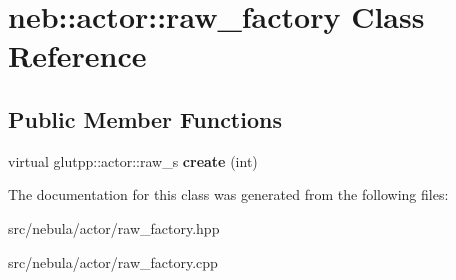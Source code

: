 \hypertarget{classneb_1_1actor_1_1raw__factory}{
\section{neb::actor::raw\_\-factory Class Reference}
\label{classneb_1_1actor_1_1raw__factory}
}
\subsection*{Public Member Functions}
\begin{DoxyCompactItemize}
\item 
\hypertarget{classneb_1_1actor_1_1raw__factory_a2118b6982b4d59339bbb855e3beaaba9}{
virtual glutpp::actor::raw\_\-s {\bfseries create} (int)}
\label{classneb_1_1actor_1_1raw__factory_a2118b6982b4d59339bbb855e3beaaba9}

\end{DoxyCompactItemize}


The documentation for this class was generated from the following files:\begin{DoxyCompactItemize}
\item 
src/nebula/actor/raw\_\-factory.hpp\item 
src/nebula/actor/raw\_\-factory.cpp\end{DoxyCompactItemize}
